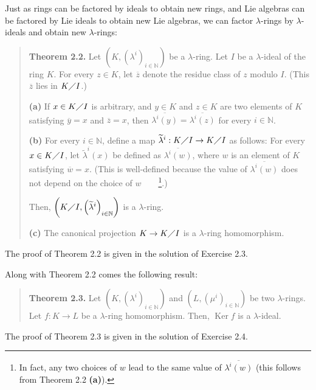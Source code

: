 \documentclass[numbers=enddot,12pt,final,onecolumn,notitlepage]{scrartcl}%
\begin{document}
Just as rings can be factored by ideals to obtain new rings, and Lie algebras
can be factored by Lie ideals to obtain new Lie algebras, we can factor
$\lambda$-rings by $\lambda$-ideals and obtain new $\lambda$-rings:

\begin{quote}
\textbf{Theorem 2.2.} Let $\left(  K,\left(  \lambda^{i}\right)
_{i\in\mathbb{N}}\right)  $ be a $\lambda$-ring. Let $I$ be a $\lambda$-ideal
of the ring $K$. For every $z\in K$, let $\overline{z}$ denote the residue
class of $z$ modulo $I$. (This $\overline{z}$ lies in $K\diagup I$.)

\textbf{(a)} If $x\in K\diagup I$ is arbitrary, and $y\in K$ and $z\in K$ are
two elements of $K$ satisfying $\overline{y}=x$ and $\overline{z}=x$, then
$\overline{\lambda^{i}\left(  y\right)  }=\overline{\lambda^{i}\left(
z\right)  }$ for every $i\in\mathbb{N}$.

\textbf{(b)} For every $i\in\mathbb{N}$, define a map $\widetilde{\lambda}%
^{i}:K\diagup I\rightarrow K\diagup I$ as follows: For every $x\in K\diagup
I$, let $\widetilde{\lambda}^{i}\left(  x\right)  $ be defined as
$\overline{\lambda^{i}\left(  w\right)  }$, where $w$ is an element of $K$
satisfying $\overline{w}=x$. (This is well-defined because the value of
$\overline{\lambda^{i}\left(  w\right)  }$ does not depend on the choice of
$w$\ \ \ \ \footnote{In fact, any two choices of $w$ lead to the same value of
$\overline{\lambda^{i}\left(  w\right)  }$ (this follows from Theorem 2.2
\textbf{(a)}).}.)

Then, $\left(  K\diagup I,\left(  \widetilde{\lambda}^{i}\right)
_{i\in\mathbb{N}}\right)  $ is a $\lambda$-ring.

\textbf{(c)} The canonical projection $K\rightarrow K\diagup I$ is a $\lambda
$-ring homomorphism.
\end{quote}

The proof of Theorem 2.2 is given in the solution of Exercise 2.3.

Along with Theorem 2.2 comes the following result:

\begin{quote}
\textbf{Theorem 2.3.} Let $\left(  K,\left(  \lambda^{i}\right)
_{i\in\mathbb{N}}\right)  $ and $\left(  L,\left(  \mu^{i}\right)
_{i\in\mathbb{N}}\right)  $ be two $\lambda$-rings. Let $f:K\rightarrow L$ be
a $\lambda$-ring homomorphism. Then, $\operatorname*{Ker}f$ is a $\lambda$-ideal.
\end{quote}

The proof of Theorem 2.3 is given in the solution of Exercise 2.4.
\end{document}
